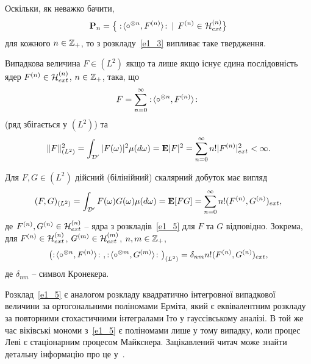 Оскільки, як неважко бачити,
\[
    \mathbf{P}_n = \big\{
        :\!\langle\circ^{\otimes n},F^{(n)}\rangle\!:\   \,  \mid \,
        F^{(n)} \in \mathcal{H}_{ext}^{(n)}\big\}
\]
для кожного $n\in\mathbb{Z}_+$, то з розкладу~\eqref{e1_3} випливає таке твердження.
\begin{subtheorem}\label{t1_2_1}
Випадкова величина $F\in (L^2)$ якщо та лише якщо існує єдина послідовність ядер $F^{(n)}\in\mathcal{H}_{ext}^{(n)}$, $n\in\mathbb{Z}_+$, така, що
\begin{equation}\label{e1_5}
    F = \sum_{n=0}^\infty :\!\langle\circ^{\otimes n},F^{(n)}\rangle\!:\ 
\end{equation}
(ряд збігається у $(L^2)$) та
\begin{equation}\label{e1_6}
   \|F\|_{(L^2)}^2 = \int_{\mathcal{D}'} |F(\omega)|^2\mu(d\omega) 
                   = \mathbf{E}|F|^2 
                   = \sum_{n=0}^\infty n! |F^{(n)}|_{ext}^2 
                   < \infty.
\end{equation}
\end{subtheorem}
\begin{subcorollary}
Для $F,G\in (L^2)$ дійсний (білінійний) скалярний добуток має вигляд
\begin{equation*}
    (F,G)_{(L^2)} = \int_{\mathcal{D}'} F(\omega)G(\omega)\mu(d\omega)
                  = \mathbf{E}[FG] 
                  = \sum_{n=0}^\infty n!(F^{(n)},G^{(n)})_{ext},
\end{equation*}
де $F^{(n)},G^{(n)}\in\mathcal{H}_{ext}^{(n)}$ -- ядра з розкладів~\eqref{e1_5} для $F$ та $G$ відповідно. 
Зокрема, для $F^{(n)}\in\mathcal{H}_{ext}^{(n)}$, $G^{(m)}\in\mathcal{H}_{ext}^{(m)}$, $n,m\in\mathbb{Z}_+$, 
\begin{equation*}
    \bigl( 
        :\!\langle\circ^{\otimes n},F^{(n)}\rangle\!:\ , 
        :\!\langle\circ^{\otimes m},G^{(m)}\rangle\!:\  
    \bigr)_{(L^2)} 
    = \delta_{nm} n!(F^{(n)},G^{(n)})_{ext},
\end{equation*}
де $\delta_{nm}$ -- символ Кронекера.
\end{subcorollary}

\begin{subremark}
Розклад~\eqref{e1_5} є аналогом розкладу квадратично інтегровної випадкової величини за ортогональними поліномами Ерміта, який є еквівалентним розкладу за повторними стохастичними інтегралами Іто у гауссівському аналізі. 
В той же час віківські мономи з~\eqref{e1_5} є поліномами лише у тому випадку, коли процес Леві є стаціонарним процесом Майкснера. 
Зацікавлений читач може знайти детальну інформацію про це у~\cite{L03}.
\end{subremark}

